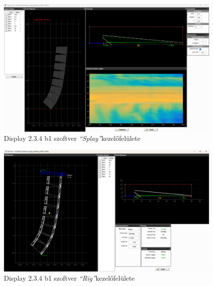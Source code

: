 \begin{figure}[H]
    \centering
    \includegraphics[width=\textwidth, keepaspectratio]{figures/display_wpc_3.png}
    \caption{Display 2.3.4 b1 szoftver \textit{``Splay''}kezelőfelülete}\label{fig:display_wpc_3}
\end{figure}

\begin{figure}[H]
    \centering
    \includegraphics[width=\textwidth, keepaspectratio]{figures/display_wpc_4.png}
    \caption{Display 2.3.4 b1 szoftver \textit{``Rig''}kezelőfelülete}\label{fig:display_wpc_4}
\end{figure}

